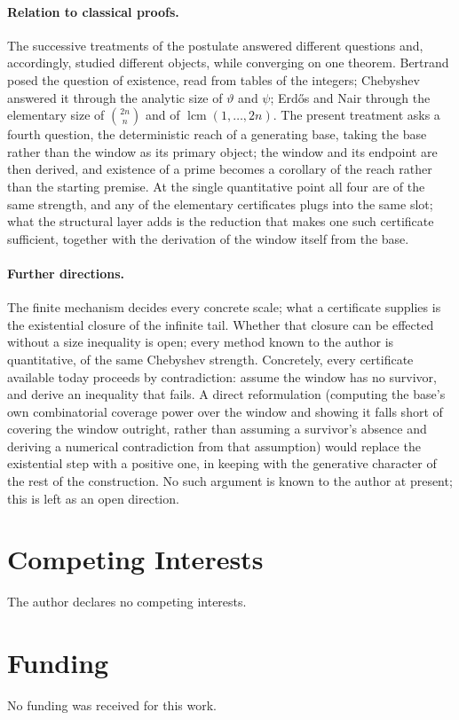 \documentclass[11pt,a4paper]{amsart}
\theoremstyle{plain}
\theoremstyle{definition}
\theoremstyle{plain}
\theoremstyle{remark}
\begin{document}
\paragraph{Relation to classical proofs.}
The successive treatments of the postulate answered different questions and, accordingly,
studied different objects, while converging on one theorem. Bertrand \cite{bertrand1845} posed
the question of existence, read from tables of the integers; Chebyshev \cite{chebyshev1852}
answered it through the analytic size of $\vartheta$ and $\psi$; Erd\H{o}s \cite{erdos1932} and
Nair \cite{nair1982} through the elementary size of $\binom{2n}{n}$ and of
$\operatorname{lcm}(1,\dots,2n)$. The present treatment asks a fourth question, the
deterministic reach of a generating base, taking the base rather than the window as its
primary object; the window and its endpoint are then derived, and existence of a prime
becomes a corollary of the reach rather than the starting premise. At the single
quantitative point all four are
of the same strength, and any of the elementary certificates plugs into the same slot; what the
structural layer adds is the reduction that makes one such certificate sufficient, together with
the derivation of the window itself from the base.

\paragraph{Further directions.}
The finite mechanism decides every concrete scale; what a certificate supplies is the
existential closure of the infinite tail. Whether that closure can be effected without a
size inequality is open; every method known to the author is quantitative, of the same
Chebyshev strength. Concretely, every certificate available today proceeds by contradiction:
assume the window has no survivor, and derive an inequality that fails. A direct
reformulation (computing the base's own combinatorial coverage power over the window and
showing it falls short of covering the window outright, rather than assuming a survivor's
absence and deriving a numerical contradiction from that assumption) would replace the
existential step with a positive one, in keeping with the generative character of the rest
of the construction. No such argument is known to the author at present; this is left as an
open direction.

\section*{Competing Interests}
The author declares no competing interests.

\section*{Funding}
No funding was received for this work.

\newpage
\printbibliography
\end{document}
